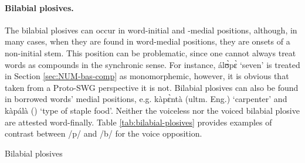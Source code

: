 
\paragraph{Bilabial plosives.}

The bilabial plosives can occur in word-initial and -medial positions, although, 
in many  cases, when they are found in  word-medial positions, they are
 onsets of a non-initial stem. This position can be problematic, since one cannot 
always treat words as compounds in the synchronic sense. For instance, {\sls 
álʊ̀pɛ̀} `seven' is treated in Section \ref{sec:NUM-bas-comp} as   
monomorphemic, however,  it is obvious that taken from a Proto-SWG perspective 
it is not. Bilabial plosives  can also be  found in borrowed words' medial 
positions, e.g. {\sls kàpɛ̀ntà} (ultm. Eng.) `carpenter' and {\sls kàpálà} 
() `type of staple food'.  Neither the 
voiceless nor the voiced bilabial plosive are attested word-finally. Table 
\ref{tab:bilabial-plosives} provides examples of contrast between /{p}/ 
and /{b}/ for the {\sc voice} opposition.


\begin{table} 
\caption{Bilabial plosives \label{tab:bilabial-plosives}}

\quad
{}

\end{table}

